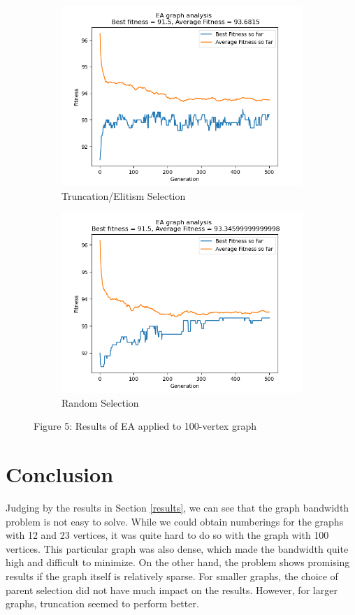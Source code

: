 \documentclass[conference,compsoc]{IEEEtran}
\begin{document}
\begin{figure}[h!]
\begin{subfigure}{0.34\textwidth}
    \includegraphics[width=\linewidth]{../Results/_100_Truncation_Truncation_200_100_500.png}
    \caption*{Truncation/Elitism Selection}
  \end{subfigure}
  \begin{subfigure}{0.34\textwidth}
    \includegraphics[width=\linewidth]{../Results/_100_Random_Truncation_200_100_500.png}
    \caption{Random Selection}
  \end{subfigure}
  \caption*{Figure 5: Results of EA applied to 100-vertex graph}
\end{figure}
\newpage
\setlength{\parskip}{0 em}
\section{Conclusion}
Judging by the results in Section \ref{results}, we can see that the graph bandwidth problem is not easy to solve. 
While we could obtain numberings for the graphs with 12 and 23 vertices, it was quite hard to do so with the graph with 
100 vertices. This particular graph was also dense, which made the bandwidth quite high and difficult to minimize. On the 
other hand, the problem shows promising results if the graph itself is relatively sparse. For smaller graphs, the choice of 
parent selection did not have much impact on the results. However, for larger graphs, truncation seemed to perform better.
\end{document}
